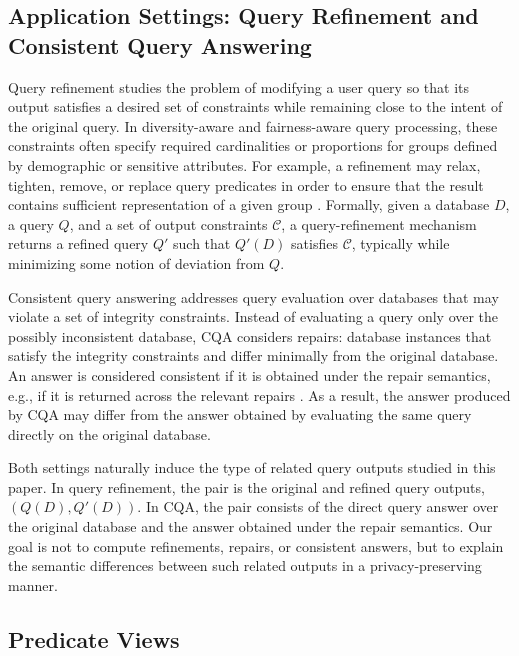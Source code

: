 \subsection{Application Settings: Query Refinement and Consistent Query Answering}

Query refinement studies the problem of modifying a user query so that
its output satisfies a desired set of constraints while remaining close
to the intent of the original query. In diversity-aware and fairness-aware
query processing, these constraints often specify required cardinalities
or proportions for groups defined by demographic or sensitive attributes.
For example, a refinement may relax, tighten, remove, or replace query
predicates in order to ensure that the result contains sufficient
representation of a given group \cite{MK09,LMSJ23,ERICA,CSSM24}.
Formally, given a database $D$, a query $Q$, and a set of output
constraints $\mathcal{C}$, a query-refinement mechanism returns a refined
query $Q'$ such that $Q'(D)$ satisfies $\mathcal{C}$, typically while
minimizing some notion of deviation from $Q$.

Consistent query answering addresses query evaluation over databases
that may violate a set of integrity constraints. Instead of evaluating a
query only over the possibly inconsistent database, CQA considers
repairs: database instances that satisfy the integrity constraints and
differ minimally from the original database. An answer is considered
consistent if it is obtained under the repair semantics, e.g., if it is
returned across the relevant repairs \cite{arenas1999,bertossi2006,bertossi2011}.
As a result, the answer produced by CQA may differ from the answer
obtained by evaluating the same query directly on the original database.

Both settings naturally induce the type of related query outputs studied
in this paper. In query refinement, the pair is the original and refined
query outputs, $(Q(D),Q'(D))$. In CQA, the pair consists of the direct
query answer over the original database and the answer obtained under
the repair semantics. Our goal is not to compute refinements, repairs, or
consistent answers, but to explain the semantic differences between such
related outputs in a privacy-preserving manner.

\subsection{Predicate Views}
\label{subsec:prelim-views}

